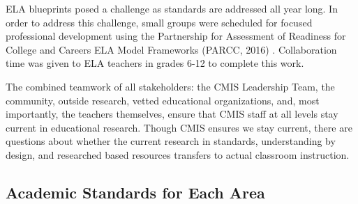 \begin{findings}

ELA blueprints posed a challenge as standards are addressed all year long. In order to address this challenge, small groups were scheduled for focused professional development using the Partnership for Assessment of Readiness for College and Careers ELA Model Frameworks (PARCC, 2016) . Collaboration time was given to ELA teachers in grades 6-12 to complete this work. 


The combined teamwork of all stakeholders: the CMIS Leadership Team, the community, outside research, vetted educational organizations, and, most importantly,  the teachers themselves, ensure that CMIS staff at all levels stay current in educational research. Though CMIS ensures we stay current, there are questions about whether the current research in standards, understanding by design, and researched based resources transfers to actual classroom instruction. 
\end{findings}

\subsection{Academic Standards for Each Area}



